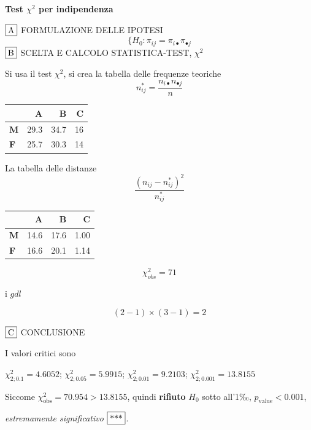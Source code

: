\documentclass[
  11pt,
]{book}
\theoremstyle{mytheoremstyle}
\theoremstyle{mydefstyle}
\newenvironment{sol}
  {
  \begin{tcolorbox}[enhanced,breakable,arc=0.1mm,boxrule=1pt,colback=white,colframe=iblue,
  title=\bf \fontfamily{lmss}\selectfont \hspace{.5 cm} Soluzione,drop fuzzy shadow]

}{
\end{tcolorbox}
  }
\begin{document}
\begin{sol}
\textbf{Test \(\chi^2\) per indipendenza}

\(\fbox{A}\) FORMULAZIONE DELLE IPOTESI
\[
\Big\{H_0:\pi_{ij}=\pi_{i\bullet}\pi_{\bullet j}
\]
\(\fbox{B}\) SCELTA E CALCOLO STATISTICA-TEST, \(\chi^2\)

Si usa il test \(\chi^2\), si crea la tabella delle frequenze teoriche
\[
n_{ij}^*=\frac{n_{i\bullet}n_{\bullet j}}{n}
\]

\begin{table}[H]
\centering
\begin{tabular}{>{}lrrr}
\toprule
  & A & B & C\\
\midrule
\textbf{M} & 29.3 & 34.7 & 16\\
\textbf{F} & 25.7 & 30.3 & 14\\
\bottomrule
\end{tabular}
\end{table}

La tabella delle distanze
\[
\frac{(n_{ij}-n_{ij}^*)^2}{n_{ij}^*}
\]

\begin{table}[H]
\centering
\begin{tabular}{>{}lrrr}
\toprule
  & A & B & C\\
\midrule
\textbf{M} & 14.6 & 17.6 & 1.00\\
\textbf{F} & 16.6 & 20.1 & 1.14\\
\bottomrule
\end{tabular}
\end{table}

\[
    \chi^2_{obs}= 71 
  \]

i \(gdl\)

\[
    ( 2 -1)\times( 3 -1)= 2 
  \]

\(\fbox{C}\) CONCLUSIONE

I valori critici sono

\(\chi^2_{2;0.1}=4.6052\); \(\chi^2_{2;0.05}=5.9915\); \(\chi^2_{2;0.01}=9.2103\); \(\chi^2_{2;0.001}=13.8155\)

Siccome \(\chi^2_\text{obs}=70.954>13.8155\), quindi \textbf{rifiuto} \(H_0\) sotto all'1‰, \(p_\text{value}<0.001\),

\emph{estremamente significativo} \(\fbox{***}\).


\end{sol}
\end{document}
